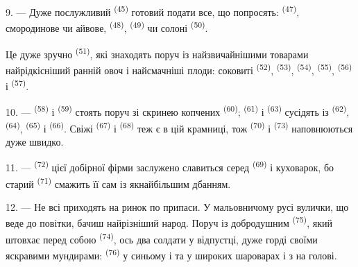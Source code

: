 9. --- Дуже послужливий  \textsuperscript{(45)} готовий подати
все, що попросять:  \textsuperscript{(47)}, смородинове чи
айвове,  \textsuperscript{(48)}, 
\textsuperscript{(49)} чи солоні  \textsuperscript{(50)}.

Це дуже зручно  \textsuperscript{(51)}, які знаходять поруч із
найзвичайнішими товарами найрідкісніший ранній овоч і найсмачніші плоди: соковиті
 \textsuperscript{(52)},  \textsuperscript{(53)},
 \textsuperscript{(54)}, 
\textsuperscript{(55)},  \textsuperscript{(56)} і
 \textsuperscript{(57)}.

\VUsaut{4.0mm}
\VUsaut{3.0mm}

10. ---  \textsuperscript{(58)} і 
\textsuperscript{(59)} стоять поруч зі скринею копчених 
\textsuperscript{(60)};  \textsuperscript{(61)} і
 \textsuperscript{(63)} сусідять із 
\textsuperscript{(62)},  \textsuperscript{(64)},
 \textsuperscript{(65)} і 
\textsuperscript{(66)}. Свіжі  \textsuperscript{(67)} і
 \textsuperscript{(68)} теж є в цій крамниці, тож
 \textsuperscript{(70)} і  \textsuperscript{(73)}
наповнюються дуже швидко.

11. ---  \textsuperscript{(72)} цієї добірної фірми заслужено
славиться серед  \textsuperscript{(69)} і куховарок, бо старий
 \textsuperscript{(71)} смажить її сам із якнайбільшим
дбанням.

\VUsaut{4.0mm}
\VUsaut{3.0mm}

12. --- Не всі приходять на ринок по припаси. У мальовничому русі вулички, що
веде до повітки, бачиш найрізніший народ. Поруч із добродушним  \textsuperscript{(75)}, який штовхає перед собою 
\textsuperscript{(74)}, ось два солдати у відпустці, дуже горді своїми яскравими
мундирами:  \textsuperscript{(76)} у синьому  і
 та  у широких шароварах і з
 на голові.

